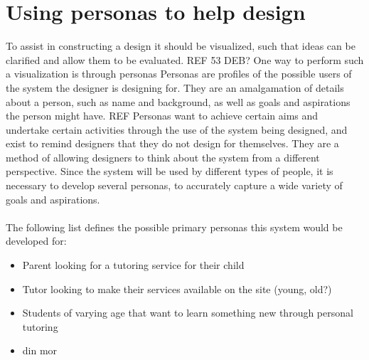 \section{Using personas to help design}
To assist in constructing a design it should be visualized, such that ideas can be clarified and allow them to be evaluated. REF 53 DEB?
One way to perform such a visualization is through personas
Personas are profiles of the possible users of the system the designer is designing for.
They are an amalgamation of details about a person, such as name and background, as well as goals and aspirations the person might have. REF
Personas want to achieve certain aims and undertake certain activities through the use of the system being designed, and exist to remind designers that they do not design for themselves.
They are a method of allowing designers to think about the system from a different perspective.
Since the system will be used by different types of people, it is necessary to develop several personas, to accurately capture a wide variety of goals and aspirations.
\\\\
The following list defines the possible primary personas this system would be developed for:
\begin{itemize}
    \item Parent looking for a tutoring service for their child
    \item Tutor looking to make their services available on the site (young, old?)
    \item Students of varying age that want to learn something new through personal tutoring
    \item din mor
\end{itemize}

